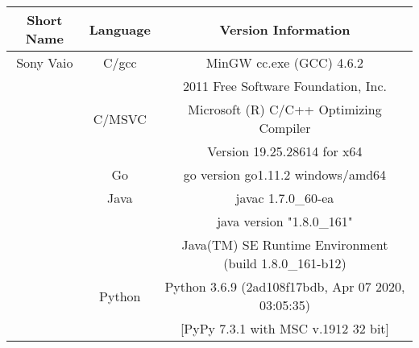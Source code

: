 \begin{center}
\begin{tabular}{|| c | c | c ||} 
\hline 
Short Name & Language & Version Information  \\ 
\hline
Sony Vaio
& C/gcc
& MinGW cc.exe (GCC) 4.6.2 \\
& & 2011 Free Software Foundation, Inc.\\
\cline{2-3}
& C/MSVC
& Microsoft (R) C/C++ Optimizing Compiler \\
& & Version 19.25.28614 for x64 \\
\cline{2-3}
&  Go
& go version go1.11.2 windows/amd64 \\
\cline{2-3}
& Java
& javac 1.7.0\_60-ea \\ 
& & java version "1.8.0\_161" \\ 
& & Java(TM) SE Runtime Environment (build 1.8.0\_161-b12) \\
\cline{2-3}
& Python
& Python 3.6.9 (2ad108f17bdb, Apr 07 2020, 03:05:35) \\
& & [PyPy 7.3.1 with MSC v.1912 32 bit] \\
 \hline \hline
\end{tabular}
\end{center}
